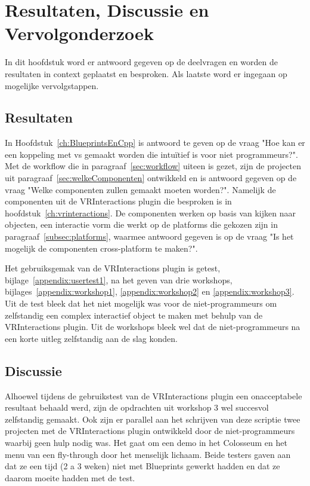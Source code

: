 \chapter{Resultaten, Discussie en Vervolgonderzoek}
\label{ch:resultatenEnDiscussie}

In dit hoofdstuk word er antwoord gegeven op de deelvragen en worden de resultaten in context geplaatst en besproken. Als laatste word er ingegaan op mogelijke vervolgstappen.

\section{Resultaten}
In Hoofdstuk~\ref{ch:BlueprintsEnCpp} is antwoord te geven op de vraag "Hoe kan er een koppeling met \gls{vs} gemaakt worden die intuïtief is voor niet programmeurs?". Met de workflow die in paragraaf~\ref{sec:workflow} uiteen is gezet, zijn de projecten uit paragraaf~\ref{sec:welkeComponenten} ontwikkeld en is antwoord gegeven op de vraag "Welke componenten zullen gemaakt moeten worden?". Namelijk de componenten uit de VRInteractions plugin die besproken is in hoofdstuk~\ref{ch:vrinteractions}. De componenten werken op basis van kijken naar objecten, een interactie vorm die werkt op de platforms die gekozen zijn in paragraaf~\ref{subsec:platforms}, waarmee antwoord gegeven is op de vraag "Is het mogelijk de componenten cross-platform te maken?".

Het gebruiksgemak van de VRInteractions plugin is getest, bijlage~\ref{appendix:usertest1}, na het geven van drie workshops, bijlages~\ref{appendix:workshop1}, \ref{appendix:workshop2} en \ref{appendix:workshop3}. Uit de test bleek dat het niet mogelijk was voor de niet-programmeurs om zelfstandig een complex interactief object te maken met behulp van de VRInteractions plugin. Uit de workshops bleek wel dat de niet-programmeurs na een korte uitleg zelfstandig aan de slag konden.

\section{Discussie}
Alhoewel tijdens de gebruikstest van de VRInteractions plugin een onacceptabele resultaat behaald werd, zijn de opdrachten uit workshop 3 wel succesvol zelfstandig gemaakt. Ook zijn er parallel aan het schrijven van deze scriptie twee projecten met de VRInteractions plugin ontwikkeld door de niet-programmeurs waarbij geen hulp nodig was. Het gaat om een demo in het Colosseum en het menu van een fly-through door het menselijk lichaam. Beide testers gaven aan dat ze een tijd (2 a 3 weken) niet met Blueprints gewerkt hadden en dat ze daarom moeite hadden met de test. 

